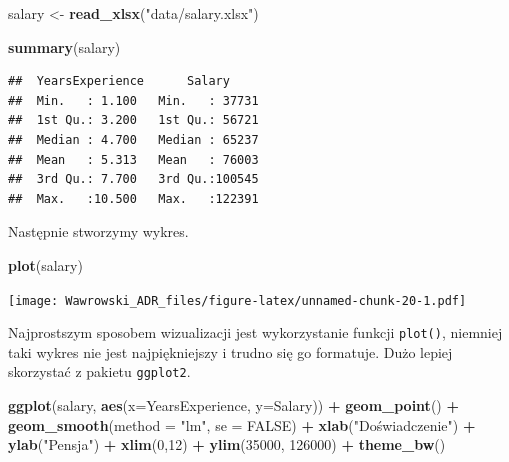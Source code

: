 \documentclass[]{book}
\newenvironment{Shaded}{\begin{snugshade}}{\end{snugshade}}
\newcommand{\DataTypeTok}[1]{\textcolor[rgb]{0.13,0.29,0.53}{#1}}
\newcommand{\DecValTok}[1]{\textcolor[rgb]{0.00,0.00,0.81}{#1}}
\newcommand{\KeywordTok}[1]{\textcolor[rgb]{0.13,0.29,0.53}{\textbf{#1}}}
\newcommand{\NormalTok}[1]{#1}
\newcommand{\OperatorTok}[1]{\textcolor[rgb]{0.81,0.36,0.00}{\textbf{#1}}}
\newcommand{\OtherTok}[1]{\textcolor[rgb]{0.56,0.35,0.01}{#1}}
\newcommand{\StringTok}[1]{\textcolor[rgb]{0.31,0.60,0.02}{#1}}
\begin{document}
\begin{Shaded}
\begin{Highlighting}[]
\NormalTok{salary <-}\StringTok{ }\KeywordTok{read_xlsx}\NormalTok{(}\StringTok{"data/salary.xlsx"}\NormalTok{)}

\KeywordTok{summary}\NormalTok{(salary)}
\end{Highlighting}
\end{Shaded}

\begin{verbatim}
##  YearsExperience      Salary      
##  Min.   : 1.100   Min.   : 37731  
##  1st Qu.: 3.200   1st Qu.: 56721  
##  Median : 4.700   Median : 65237  
##  Mean   : 5.313   Mean   : 76003  
##  3rd Qu.: 7.700   3rd Qu.:100545  
##  Max.   :10.500   Max.   :122391
\end{verbatim}

Następnie stworzymy wykres.

\begin{Shaded}
\begin{Highlighting}[]
\KeywordTok{plot}\NormalTok{(salary)}
\end{Highlighting}
\end{Shaded}

\texttt{[image: Wawrowski\_ADR\_files/figure-latex/unnamed-chunk-20-1.pdf]}

Najprostszym sposobem wizualizacji jest wykorzystanie funkcji \texttt{plot()}, niemniej taki wykres nie jest najpiękniejszy i trudno się go formatuje. Dużo lepiej skorzystać z pakietu \texttt{ggplot2}.

\begin{Shaded}
\begin{Highlighting}[]
\KeywordTok{ggplot}\NormalTok{(salary, }\KeywordTok{aes}\NormalTok{(}\DataTypeTok{x=}\NormalTok{YearsExperience, }\DataTypeTok{y=}\NormalTok{Salary)) }\OperatorTok{+}\StringTok{ }
\StringTok{  }\KeywordTok{geom_point}\NormalTok{() }\OperatorTok{+}
\StringTok{  }\KeywordTok{geom_smooth}\NormalTok{(}\DataTypeTok{method =} \StringTok{"lm"}\NormalTok{, }\DataTypeTok{se =} \OtherTok{FALSE}\NormalTok{) }\OperatorTok{+}
\StringTok{  }\KeywordTok{xlab}\NormalTok{(}\StringTok{"Doświadczenie"}\NormalTok{) }\OperatorTok{+}\StringTok{ }
\StringTok{  }\KeywordTok{ylab}\NormalTok{(}\StringTok{"Pensja"}\NormalTok{) }\OperatorTok{+}
\StringTok{  }\KeywordTok{xlim}\NormalTok{(}\DecValTok{0}\NormalTok{,}\DecValTok{12}\NormalTok{) }\OperatorTok{+}
\StringTok{  }\KeywordTok{ylim}\NormalTok{(}\DecValTok{35000}\NormalTok{, }\DecValTok{126000}\NormalTok{) }\OperatorTok{+}
\StringTok{  }\KeywordTok{theme_bw}\NormalTok{()}
\end{Highlighting}
\end{Shaded}
\end{document}
